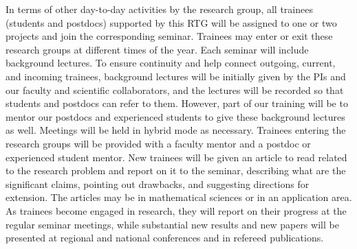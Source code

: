 \documentclass[11pt]{NSFamsart}
\begin{document}


In terms of other day-to-day activities by the research group, 
all trainees (students and postdocs) supported by this RTG will be assigned to one or two projects and join the corresponding seminar. 
Trainees may enter or exit these research groups at different times of the year. Each seminar will include background lectures. To ensure  continuity and  help connect outgoing, current, and incoming trainees, background lectures will be  %
initially given by the PIs and our faculty and scientific collaborators, and the lectures will be recorded so that students and postdocs can refer to them.  However, part of our training will be to mentor our postdocs and experienced students to give these background lectures as well.  
Meetings will be held in hybrid mode as necessary. %
Trainees entering the research groups will be provided with a faculty mentor and a postdoc or experienced student mentor.  New trainees will be given an article to read related to the research problem and report on it to the seminar, describing what are the significant claims, pointing out drawbacks, and suggesting directions for extension. The articles may be in mathematical sciences or in an application area.
As trainees become engaged in research, they will report on their progress at the regular seminar meetings, while substantial new results and new papers will be presented at regional and national conferences and in refereed publications.
\end{document}
